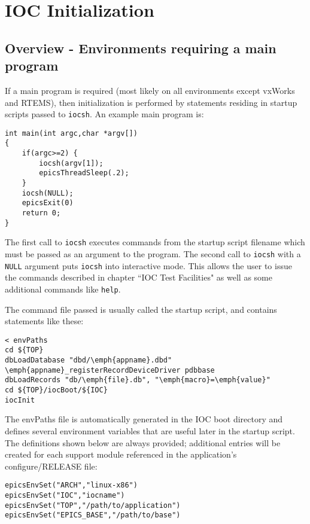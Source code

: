 \chapter{IOC Initialization}

\section{Overview - Environments requiring a main program}

If a main program is required (most likely on all environments except vxWorks and RTEMS), then initialization is 
performed by statements residing in startup scripts passed to \verb|iocsh|. An example main program is:

\begin{verbatim}int main(int argc,char *argv[])
{
    if(argc>=2) {
        iocsh(argv[1]);
        epicsThreadSleep(.2);
    }
    iocsh(NULL);
    epicsExit(0)
    return 0;
}
\end{verbatim}The first call to \verb|iocsh| executes commands from the startup script filename which must be passed as an argument to the 
program. The second call to \verb|iocsh| with a \verb|NULL| argument puts \verb|iocsh| into interactive mode. This allows the user to 
issue the commands described in chapter ``IOC Test Facilities" as well as some additional commands like \verb|help|.

The command file passed is usually called the startup script, and contains statements like these:

\begin{verbatim}< envPaths
cd ${TOP}
dbLoadDatabase "dbd/\emph{appname}.dbd"
\emph{appname}_registerRecordDeviceDriver pdbbase
dbLoadRecords "db/\emph{file}.db", "\emph{macro}=\emph{value}"
cd ${TOP}/iocBoot/${IOC}
iocInit
\end{verbatim}The envPaths file is automatically generated in the IOC boot directory and defines several environment variables that are 
useful later in the startup script. The definitions shown below are always provided; additional entries will be created for 
each support module referenced in the application's configure/RELEASE file:

\begin{verbatim}epicsEnvSet("ARCH","linux-x86")
epicsEnvSet("IOC","iocname")
epicsEnvSet("TOP","/path/to/application")
epicsEnvSet("EPICS_BASE","/path/to/base")
\end{verbatim}

